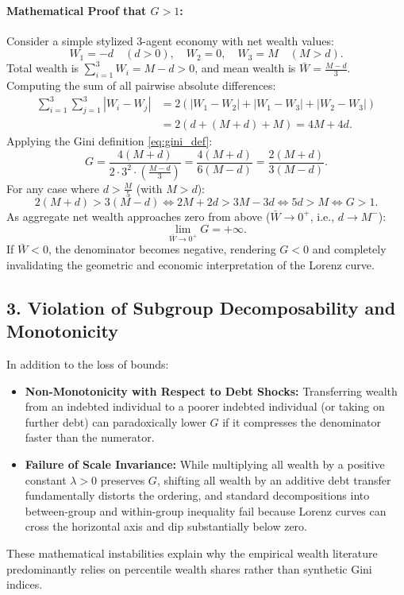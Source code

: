 \paragraph{Mathematical Proof that $G > 1$:}
Consider a simple stylized 3-agent economy with net wealth values:
\[
    W_1 = -d \quad (d > 0), \quad W_2 = 0, \quad W_3 = M \quad (M > d).
\]
Total wealth is $\sum_{i=1}^3 W_i = M - d > 0$, and mean wealth is $\bar{W} = \frac{M - d}{3}$. Computing the sum of all pairwise absolute differences:
\begin{align*}
    \sum_{i=1}^3 \sum_{j=1}^3 |W_i - W_j| &= 2 \left( |W_1 - W_2| + |W_1 - W_3| + |W_2 - W_3| \right) \\
    &= 2 \left( d + (M + d) + M \right) = 4M + 4d.
\end{align*}
Applying the Gini definition \eqref{eq:gini_def}:
\begin{equation}
    G = \frac{4(M + d)}{2 \cdot 3^2 \cdot \left(\frac{M - d}{3}\right)} = \frac{4(M + d)}{6(M - d)} = \frac{2(M + d)}{3(M - d)}.
\end{equation}
For any case where $d > \frac{M}{5}$ (with $M > d$):
\[
    2(M + d) > 3(M - d) \iff 2M + 2d > 3M - 3d \iff 5d > M \iff G > 1.
\]
As aggregate net wealth approaches zero from above ($\bar{W} \to 0^+$, i.e., $d \to M^-$):
\begin{equation}
    \lim_{\bar{W} \to 0^+} G = +\infty.
\end{equation}
If $\bar{W} < 0$, the denominator becomes negative, rendering $G < 0$ and completely invalidating the geometric and economic interpretation of the Lorenz curve.

\subsection*{3. Violation of Subgroup Decomposability and Monotonicity}
In addition to the loss of bounds:
\begin{itemize}
    \item \textbf{Non-Monotonicity with Respect to Debt Shocks:} Transferring wealth from an indebted individual to a poorer indebted individual (or taking on further debt) can paradoxically lower $G$ if it compresses the denominator faster than the numerator.
    \item \textbf{Failure of Scale Invariance:} While multiplying all wealth by a positive constant $\lambda > 0$ preserves $G$, shifting all wealth by an additive debt transfer fundamentally distorts the ordering, and standard decompositions into between-group and within-group inequality fail because Lorenz curves can cross the horizontal axis and dip substantially below zero.
\end{itemize}
These mathematical instabilities explain why the empirical wealth literature \citep[e.g.,][]{vermeulen2018,oecd2013wealth} predominantly relies on percentile wealth shares rather than synthetic Gini indices.



